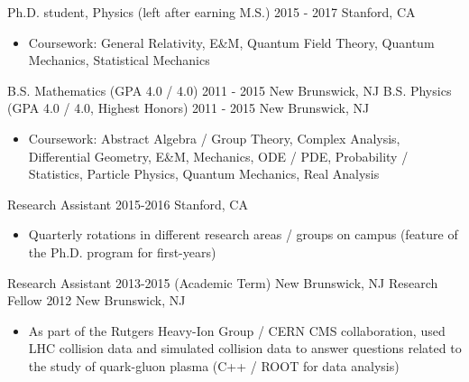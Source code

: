 \documentclass[8pt,a4paper]{altacv}
\begin{document}
    
                {Ph.D. student, Physics (left after earning M.S.)}
                {2015 - 2017}
                {Stanford, CA}
                {\begin{itemize}[leftmargin=0pt]
                \renewcommand\labelitemi{}
                    \item {\color{emphasis}Coursework:} General Relativity, E\&M, Quantum Field Theory, Quantum Mechanics, Statistical Mechanics
                \end{itemize}}
            
                {B.S. Mathematics (GPA 4.0 / 4.0)}
                {2011 - 2015}
                {New Brunswick, NJ}
                {}
        \vspace{-8pt} %
        \cvevent{} %
                {B.S. Physics (GPA 4.0 / 4.0, Highest Honors)}
                {2011 - 2015}
                {New Brunswick, NJ}
                {\begin{itemize}[leftmargin=0pt]
                \renewcommand\labelitemi{}
                    \item {\color{emphasis}Coursework:} Abstract Algebra / Group Theory, Complex Analysis, Differential Geometry, E\&M, Mechanics, ODE / PDE, Probability / Statistics, Particle Physics, Quantum Mechanics, Real Analysis
                \end{itemize}}
    
                {Research Assistant}
                {2015-2016}
                {Stanford, CA}
                {\begin{itemize}[leftmargin=0pt]
                \renewcommand\labelitemi{}
                    \item Quarterly rotations in different research areas / groups on campus (feature of the Ph.D. program for first-years)
                \end{itemize}}

            {Research Assistant}
            {2013-2015 (Academic Term)}
            {New Brunswick, NJ}
            {}
    \vspace{-8pt}
    \cvevent{}
            {Research Fellow}
            {2012}
            {New Brunswick, NJ}
            {\begin{itemize}[leftmargin=0pt]
            \renewcommand\labelitemi{}
                \item As part of the Rutgers Heavy-Ion Group / CERN CMS collaboration, used LHC collision data and simulated collision data to answer questions related to the study of quark-gluon plasma (C++ / ROOT for data analysis) 
            \end{itemize}}
    
\end{document}
